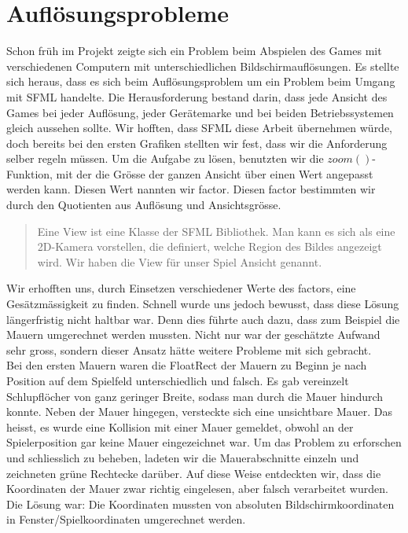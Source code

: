 \documentclass[11pt,a4paper]{scrbook}
\begin{document}
\section{Auflösungsprobleme}     
\label{aufloesungsprobleme}
Schon früh im Projekt zeigte sich ein Problem beim Abspielen des Games mit verschiedenen Computern mit unterschiedlichen Bildschirmauflösungen. Es stellte sich heraus, dass es sich
beim Auflösungsproblem um ein Problem beim Umgang mit SFML handelte.
Die Herausforderung bestand darin, dass jede Ansicht des Games bei jeder Auflösung, jeder Gerätemarke und bei beiden Betriebssystemen gleich aussehen sollte.
Wir hofften, dass SFML diese Arbeit übernehmen würde, doch bereits bei den ersten Grafiken stellten wir fest, dass wir die Anforderung selber regeln müssen.
Um die Aufgabe zu lösen, benutzten wir die $zoom()$-Funktion, mit der die Grösse der ganzen Ansicht über einen Wert angepasst werden kann.
Diesen Wert nannten wir factor.
Diesen factor bestimmten wir durch den Quotienten aus Auflösung und Ansichtsgrösse.
\begin{quote}
Eine View ist eine Klasse der SFML Bibliothek.
Man kann es sich als eine 2D-Kamera vorstellen, die definiert, welche Region des Bildes angezeigt wird.
Wir haben die View für unser Spiel Ansicht genannt.
\end{quote}
Wir erhofften uns, durch Einsetzen verschiedener Werte des factors, eine Gesätzmässigkeit zu finden.
Schnell wurde uns jedoch bewusst, dass diese Lösung längerfristig nicht haltbar war. 
Denn dies führte auch dazu, dass zum Beispiel die Mauern umgerechnet werden mussten.
Nicht nur war der geschätzte Aufwand sehr gross, sondern dieser Ansatz hätte weitere Probleme mit sich gebracht.
\\
\label{mauern}
Bei den ersten Mauern waren die FloatRect der Mauern zu Beginn je nach Position auf dem Spielfeld unterschiedlich und falsch.
Es gab vereinzelt Schlupflöcher von ganz geringer Breite, sodass man durch die Mauer hindurch konnte. 
Neben der Mauer hingegen, versteckte sich eine unsichtbare Mauer. 
Das heisst, es wurde eine Kollision mit einer Mauer gemeldet, obwohl an der Spielerposition gar keine Mauer eingezeichnet war. 
Um das Problem zu erforschen und schliesslich zu beheben, ladeten
wir die Mauerabschnitte einzeln und zeichneten grüne Rechtecke darüber. 
Auf diese Weise entdeckten wir, dass die Koordinaten der Mauer zwar richtig eingelesen, aber falsch verarbeitet wurden. Die Lösung war: Die Koordinaten mussten
von absoluten Bildschirmkoordinaten in Fenster/Spielkoordinaten umgerechnet werden. 
\end{document}
